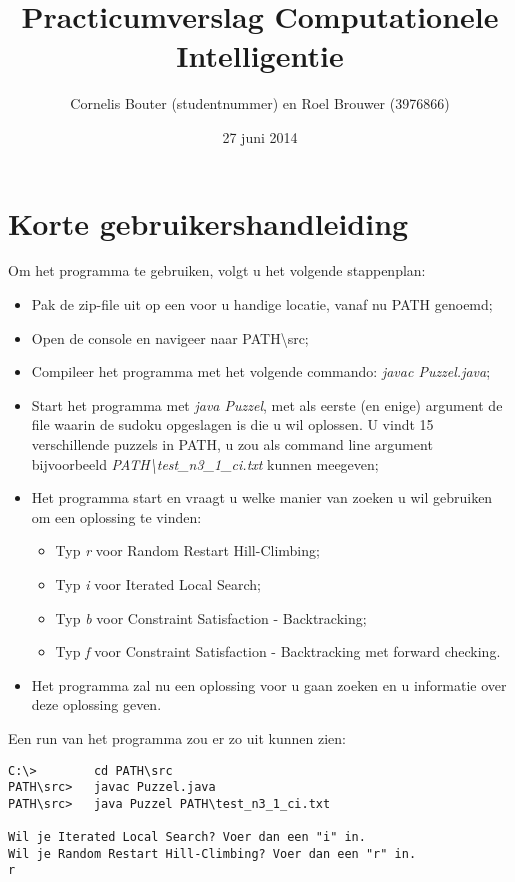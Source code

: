 \documentclass[]{report}
\title{Practicumverslag Computationele Intelligentie}
\author{Cornelis Bouter (studentnummer) en Roel Brouwer (3976866)}
\date{27 juni 2014}
\begin{document}
\maketitle

\chapter{Korte gebruikershandleiding}
Om het programma te gebruiken, volgt u het volgende stappenplan:
\begin{itemize}
\item Pak de zip-file uit op een voor u handige locatie, vanaf nu PATH genoemd;
\item Open de console en navigeer naar PATH\textbackslash src;
\item Compileer het programma met het volgende commando: \textit{javac Puzzel.java};
\item Start het programma met \textit{java Puzzel}, met als eerste (en enige) argument de file waarin de sudoku opgeslagen is die u wil oplossen. U vindt 15 verschillende puzzels in PATH, u zou als command line argument bijvoorbeeld \textit{PATH\textbackslash test\_n3\_1\_ci.txt} kunnen meegeven;
\item Het programma start en vraagt u welke manier van zoeken u wil gebruiken om een oplossing te vinden:
\begin{itemize}
\item Typ \textit{r} voor Random Restart Hill-Climbing;
\item Typ \textit{i} voor Iterated Local Search;
\item Typ \textit{b} voor Constraint Satisfaction - Backtracking;
\item Typ \textit{f} voor Constraint Satisfaction - Backtracking met forward checking.
\end{itemize}
\item Het programma zal nu een oplossing voor u gaan zoeken en u informatie over deze oplossing geven.
\end{itemize}
Een run van het programma zou er zo uit kunnen zien:

\begin{minipage}{\textwidth}
\begin{lstlisting}
C:\>		cd PATH\src
PATH\src>	javac Puzzel.java
PATH\src>	java Puzzel PATH\test_n3_1_ci.txt

Wil je Iterated Local Search? Voer dan een "i" in.
Wil je Random Restart Hill-Climbing? Voer dan een "r" in.
r
\end{lstlisting}
\end{minipage}
\end{document}
